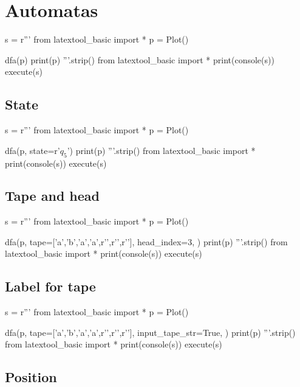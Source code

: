 \section{Automatas}


\begin{python}
s = r'''
from latextool_basic import *
p = Plot()

dfa(p)
print(p)
'''.strip()
from latextool_basic import *
print(console(s))
execute(s)
\end{python}


\newpage
\subsection{State}
\begin{python}
s = r'''
from latextool_basic import *
p = Plot()

dfa(p,
    state=r'$q_5$')
print(p)
'''.strip()
from latextool_basic import *
print(console(s))
execute(s)
\end{python}


\newpage
\subsection{Tape and head}
\begin{python}
s = r'''
from latextool_basic import *
p = Plot()

dfa(p,
    tape=['a','b','a','a',r'\SPACE',r'\SPACE',r'\SPACE'],
    head_index=3,
    )
print(p)
'''.strip()
from latextool_basic import *
print(console(s))
execute(s)
\end{python}




\subsection{Label for tape}

\begin{python}
s = r'''
from latextool_basic import *
p = Plot()

dfa(p,
    tape=['a','b','a','a',r'\SPACE',r'\SPACE',r'\SPACE'],
    input_tape_str=True,
    )
print(p)
'''.strip()
from latextool_basic import *
print(console(s))
execute(s)
\end{python}



\newpage
\subsection{Position}

